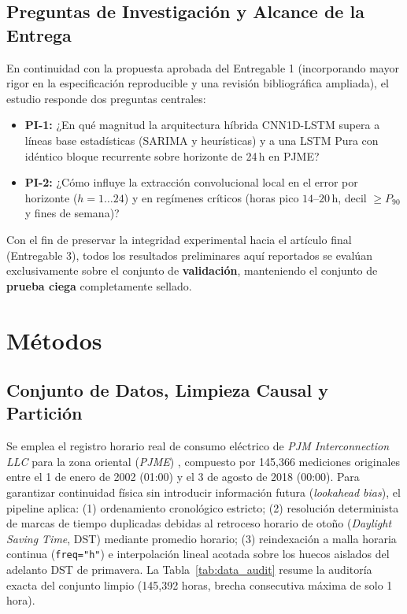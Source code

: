 \documentclass[conference]{IEEEtran}
\begin{document}
\subsection{Preguntas de Investigación y Alcance de la Entrega}
En continuidad con la propuesta aprobada del Entregable 1 (incorporando mayor rigor en la especificación reproducible y una revisión bibliográfica ampliada), el estudio responde dos preguntas centrales:
\begin{itemize}
    \item \textbf{PI-1:} ¿En qué magnitud la arquitectura híbrida CNN1D-LSTM supera a líneas base estadísticas (SARIMA y heurísticas) y a una LSTM Pura con idéntico bloque recurrente sobre horizonte de 24\,h en PJME?
    \item \textbf{PI-2:} ¿Cómo influye la extracción convolucional local en el error por horizonte ($h=1\dots 24$) y en regímenes críticos (horas pico $14\text{--}20\,\text{h}$, decil $\ge P_{90}$ y fines de semana)?
\end{itemize}
Con el fin de preservar la integridad experimental hacia el artículo final (Entregable 3), todos los resultados preliminares aquí reportados se evalúan exclusivamente sobre el conjunto de \textbf{validación}, manteniendo el conjunto de \textbf{prueba ciega} completamente sellado.

\section{Métodos}

\subsection{Conjunto de Datos, Limpieza Causal y Partición}
Se emplea el registro horario real de consumo eléctrico de \textit{PJM Interconnection LLC} para la zona oriental (\textit{PJME}) \cite{pjm2018data}, compuesto por 145{,}366 mediciones originales entre el 1 de enero de 2002 (01:00) y el 3 de agosto de 2018 (00:00). Para garantizar continuidad física sin introducir información futura (\textit{lookahead bias}), el pipeline aplica: (1) ordenamiento cronológico estricto; (2) resolución determinista de marcas de tiempo duplicadas debidas al retroceso horario de otoño (\textit{Daylight Saving Time}, DST) mediante promedio horario; (3) reindexación a malla horaria continua (\texttt{freq="h"}) e interpolación lineal acotada sobre los huecos aislados del adelanto DST de primavera. La Tabla~\ref{tab:data_audit} resume la auditoría exacta del conjunto limpio (145{,}392 horas, brecha consecutiva máxima de solo 1 hora).
\end{document}
